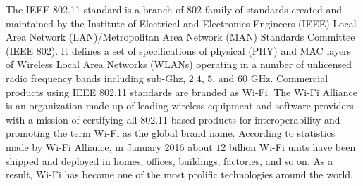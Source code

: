 The IEEE 802.11 standard is a branch of 802 family of standards created and maintained by the Institute of Electrical and Electronics Engineers (IEEE) Local Area Network (LAN)/Metropolitan Area Network (MAN) Standards Committee (IEEE 802). It defines a set of specifications of physical (PHY) and MAC layers of Wireless Local Area Networks (WLANs) operating in a number of unlicensed radio frequency bands including sub-Ghz, $2.4$, $5$, and $60$ GHz. Commercial products using IEEE 802.11 standards are branded as \mbox{Wi-Fi}. The \mbox{Wi-Fi} Alliance is an organization made up of leading wireless equipment and software providers with a mission of certifying all 802.11-based products for interoperability and promoting the term \mbox{Wi-Fi} as the global brand name. According to statistics made by \mbox{Wi-Fi} Alliance, in January 2016 about $12$ billion \mbox{Wi-Fi} units have been shipped and deployed in homes, offices, buildings, factories, and so on. As a result, \mbox{Wi-Fi} has become one of the most prolific technologies around the world. 

